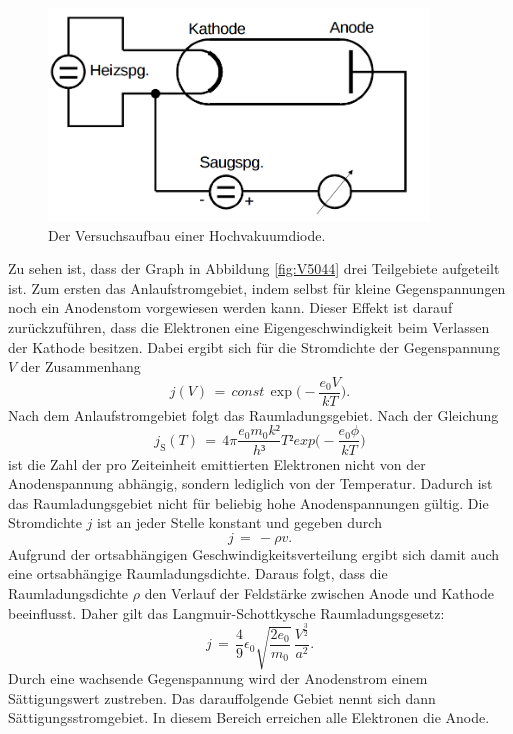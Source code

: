 \documentclass[
  bibliography=totoc,     %
  captions=tableheading,  %
  titlepage=firstiscover, %
]{scrartcl}
\begin{document}
\begin{figure}[H]
  \centering
  \includegraphics[width=0.9\textwidth]{V5045.png}
  \caption{Der Versuchsaufbau einer Hochvakuumdiode. \cite{anleitung}}
  \label{fig:V5045}
\end{figure}
\noindent
Zu sehen ist, dass der Graph in Abbildung \ref{fig:V5044} drei Teilgebiete aufgeteilt ist. Zum ersten das Anlaufstromgebiet, indem selbst für kleine Gegenspannungen noch ein Anodenstom vorgewiesen werden kann. Dieser Effekt ist darauf zurückzuführen, dass die Elektronen eine Eigengeschwindigkeit beim Verlassen der Kathode besitzen. Dabei ergibt sich für die Stromdichte der Gegenspannung $V$ der Zusammenhang
\begin{equation}
  j(V)\,=\,const\,\exp\Big(-\frac{e_0V}{kT}\Big).
  \label{eqn:stromdichte}
\end{equation}
Nach dem Anlaufstromgebiet folgt das Raumladungsgebiet. Nach der Gleichung
\begin{equation}
  j_\mathup{S} (T)\,=\,4\pi \frac{e_0 m_0 k²}{h³} T² exp\Big(-\frac{e_0 \phi}{kT}\Big)
  \label{eqn:richardson}
\end{equation}
ist die Zahl der pro Zeiteinheit emittierten Elektronen nicht von der Anodenspannung abhängig, sondern lediglich von der Temperatur. Dadurch ist das Raumladungsgebiet nicht für beliebig hohe Anodenspannungen gültig. Die Stromdichte $j$ ist an jeder Stelle konstant und gegeben durch
\begin{equation}
  j\,=\,-\rho v.
  \label{eqn:j}
\end{equation}
Aufgrund der ortsabhängigen Geschwindigkeitsverteilung ergibt sich damit auch eine
ortsabhängige Raumladungsdichte.
Daraus folgt, dass die Raumladungsdichte $\rho$ den Verlauf der Feldstärke zwischen Anode und Kathode beeinflusst. Daher gilt das Langmuir-Schottkysche Raumladungsgesetz:
\begin{equation}
  j\,=\,\frac{4}{9} \epsilon_0 \sqrt{\frac{2e_0}{m_0}}\,\frac{V^{\frac{3}{2}}}{a^2}.
  \label{eqn:raumladung}
\end{equation}
\noindent
Durch eine wachsende Gegenspannung wird der Anodenstrom einem Sättigungswert zustreben. Das darauffolgende Gebiet nennt sich dann Sättigungsstromgebiet. In diesem Bereich erreichen alle Elektronen die Anode.
\end{document}
